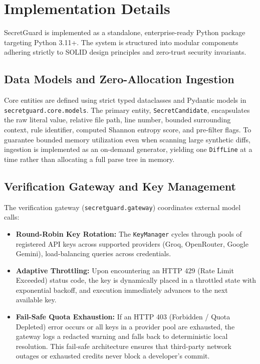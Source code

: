 \section{Implementation Details}
\label{sec:implementation}

SecretGuard is implemented as a standalone, enterprise-ready Python package targeting Python 3.11+. The system is structured into modular components adhering strictly to SOLID design principles and zero-trust security invariants.

\subsection{Data Models and Zero-Allocation Ingestion}
Core entities are defined using strict typed dataclasses and Pydantic models in \texttt{secretguard.core.models}. The primary entity, \texttt{SecretCandidate}, encapsulates the raw literal value, relative file path, line number, bounded surrounding context, rule identifier, computed Shannon entropy score, and pre-filter flags. To guarantee bounded memory utilization even when scanning large synthetic diffs, ingestion is implemented as an on-demand generator, yielding one \texttt{DiffLine} at a time rather than allocating a full parse tree in memory.

\subsection{Verification Gateway and Key Management}
The verification gateway (\texttt{secretguard.gateway}) coordinates external model calls:
\begin{itemize}
    \item \textbf{Round-Robin Key Rotation:} The \texttt{KeyManager} cycles through pools of registered API keys across supported providers (Groq, OpenRouter, Google Gemini), load-balancing queries across credentials.
    \item \textbf{Adaptive Throttling:} Upon encountering an HTTP 429 (Rate Limit Exceeded) status code, the key is dynamically placed in a throttled state with exponential backoff, and execution immediately advances to the next available key.
    \item \textbf{Fail-Safe Quota Exhaustion:} If an HTTP 403 (Forbidden / Quota Depleted) error occurs or all keys in a provider pool are exhausted, the gateway logs a redacted warning and falls back to deterministic local resolution. This fail-safe architecture ensures that third-party network outages or exhausted credits never block a developer's commit.
\end{itemize}

